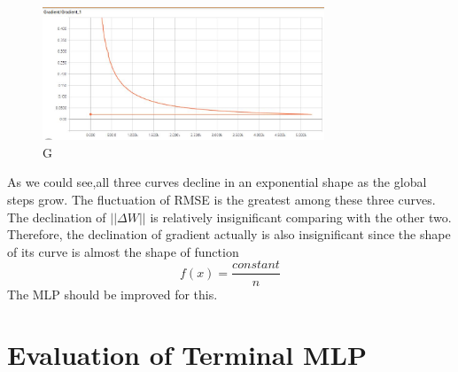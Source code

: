 \documentclass{article}
\begin{document}
  \begin{figure}[H]
  \centering
  \includegraphics[width=0.75\textwidth]{Gradient.jpg}
  \caption{G}\label{}
  \end{figure}
As we could see,all three curves decline in an exponential shape as the global steps grow. The fluctuation of RMSE is the greatest among these three curves. The declination of $||\Delta W||$ is relatively insignificant comparing with the other two. Therefore, the declination of gradient actually is also insignificant since the shape of its curve is almost the shape of function \[f(x)=\frac{constant}{n}\]The MLP should be improved for this.
\section{Evaluation of Terminal MLP}
\end{document}

